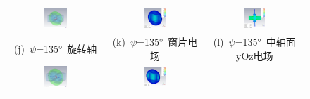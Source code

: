 \documentclass[master]{thesis-uestc}
\begin{document}
\begin{figure}[!htb]
\begin{tabular}{@{\ }c@{\ }c@{\ }c}
        \includegraphics[width=0.25\textwidth]{pic/chapter5/X135旋转轴.png} & 
        \hspace{5pt}
        \includegraphics[width=0.23\textwidth]{pic/chapter5/X135电场整体.png}& 
        \hspace{5pt}
        \includegraphics[width=0.23\textwidth]{pic/chapter5/X135电场切面.png}     \\
        \mbox{\small (j) \(\psi\)=135° 旋转轴}                                                                               & 
        \mbox{\small (k) \(\psi\)=135° 窗片电场}    & 
        \mbox{\small (l) \(\psi\)=135° 中轴面yOz电场}                                                                                 \\[6bp]
        \includegraphics[width=0.25\textwidth]{pic/chapter5/X180旋转轴.png} & 
        \hspace{5pt}
        \includegraphics[width=0.23\textwidth]{pic/chapter5/X180电场整体.png}  & 

\end{tabular}
\end{figure}
\end{document}
